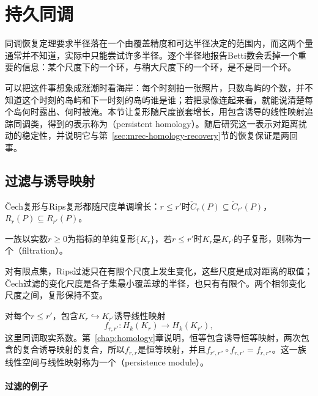 \section{持久同调}
\label{sec:mrec-persistence}

同调恢复定理要求半径落在一个由覆盖精度和可达半径决定的范围内，而这两个量通常并不知道，实际中只能尝试许多半径。逐个半径地报告Betti数会丢掉一个重要的信息：某个尺度下的一个环，与稍大尺度下的一个环，是不是同一个环。

可以把这件事想象成涨潮时看海岸：每个时刻拍一张照片，只数岛屿的个数，并不知道这个时刻的岛屿和下一时刻的岛屿谁是谁；若把录像连起来看，就能说清楚每个岛何时露出、何时被淹。本节让复形随尺度嵌套增长，用包含诱导的线性映射追踪同调类，得到的表示称为（persistent homology）。随后研究这一表示对距离扰动的稳定性，并说明它与第~\ref{sec:mrec-homology-recovery}节的恢复保证是两回事。

\subsection{过滤与诱导映射}
\label{sec:mrec-filtration}

Čech复形与Rips复形都随尺度单调增长：$r\leq r'$时$\check C_r(P)\subseteq\check C_{r'}(P)$，$R_r(P)\subseteq R_{r'}(P)$。

\begin{definition}[过滤]
\label{def:mrec-filtration}
一族以实数$r\geq0$为指标的单纯复形$\{K_r\}$，若$r\leq r'$时$K_r$是$K_{r'}$的子复形，则称为一个（filtration）。
\end{definition}

对有限点集，Rips过滤只在有限个尺度上发生变化，这些尺度是成对距离的取值；Čech过滤的变化尺度是各子集最小覆盖球的半径，也只有有限个。两个相邻变化尺度之间，复形保持不变。

对每个$r\leq r'$，包含$K_r\hookrightarrow K_{r'}$诱导线性映射
\begin{equation}
 f_{r,r'}:H_k(K_r)\to H_k(K_{r'}),
 \label{eq:mrec-induced-map}
\end{equation}
这里同调取实系数。第~\ref{chap:homology}章说明，恒等包含诱导恒等映射，两次包含的复合诱导映射的复合，所以$f_{r,r}$是恒等映射，并且$f_{r',r''}\circ f_{r,r'}=f_{r,r''}$。这一族线性空间与线性映射称为一个（persistence module）。

\paragraph{过滤的例子}

